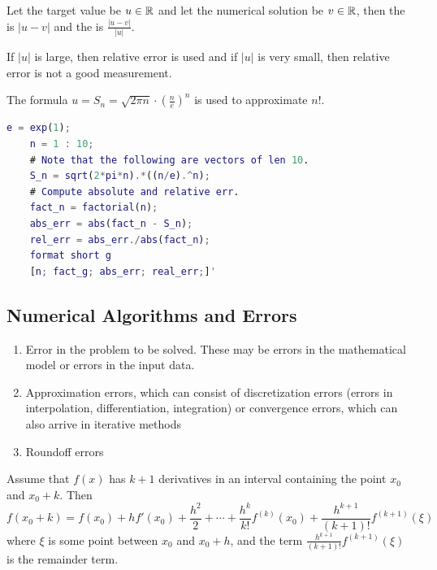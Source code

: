 \documentclass[12pt]{scrartcl}
\begin{document}
\begin{definition}
  Let the target value be $u \in \mathbb R$ and let the numerical solution be $v \in \mathbb R$, then the 
   is $|u-v|$ and the  is $\frac{|u-v|}{|u|}$.
\end{definition}

\begin{note}
If $|u|$ is large, then relative error is used and if $|u|$ is very small, then relative error 
is not a good measurement.
\end{note}

\begin{example}
  The formula $u = S_n = \sqrt{2\pi n} \cdot(\frac{n}{e})^n$ is used to approximate $n!$.
  \begin{lstlisting}[language=Matlab]
    e = exp(1);
    n = 1 : 10;
    # Note that the following are vectors of len 10.
    S_n = sqrt(2*pi*n).*((n/e).^n);
    # Compute absolute and relative err.
    fact_n = factorial(n);
    abs_err = abs(fact_n - S_n);
    rel_err = abs_err./abs(fact_n);
    format short g
    [n; fact_g; abs_err; real_err;]'
  \end{lstlisting}
\end{example}

\subsection{Numerical Algorithms and Errors}

\begin{definition}

  \hfill

  \begin{enumerate}
    \item Error in the problem to be solved. These may be errors in the mathematical model or errors in the input data.
    \item Approximation errors, which can consist of discretization errors (errors in interpolation, differentiation, integration) or 
    convergence errors, which can also arrive in iterative methods
    \item Roundoff errors
  \end{enumerate}
\end{definition}

\begin{definition}
  Assume that $f(x)$ has $k+1$ derivatives in an interval containing the point $x_0$ and 
  $x_0 + k$. Then 
  \[f(x_0 + k) = f(x_0) + hf'(x_0)+ \frac{h^2}{2} + \cdots + \frac{h^k}{k!}f^{(k)}(x_0) + \frac{h^{k+1}}{(k+1)!}f^{(k+1)}(\xi)\]
  where $\xi$ is some point between $x_0$ and $x_0 + h$, and the term $\frac{h^{k+1}}{(k+1)!}f^{(k+1)}(\xi)$ is the remainder term.
\end{definition}
\end{document}
